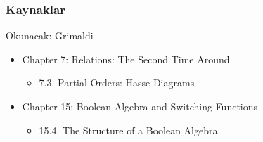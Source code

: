 \documentclass[dvipsnames]{beamer}
\theoremstyle{definition}
\theoremstyle{example}
\theoremstyle{plain}
\begin{document}
\begin{frame}
  \frametitle{Kaynaklar}

  \begin{block}{Okunacak: Grimaldi}
    \begin{itemize}
      \item Chapter 7: Relations: The Second Time Around
      \begin{itemize}
        \item 7.3. \alert{Partial Orders: Hasse Diagrams}
      \end{itemize}

      \item Chapter 15: Boolean Algebra and Switching Functions
      \begin{itemize}
        \item 15.4. \alert{The Structure of a Boolean Algebra}
      \end{itemize}
    \end{itemize}
  \end{block}
\end{frame}
\end{document}
